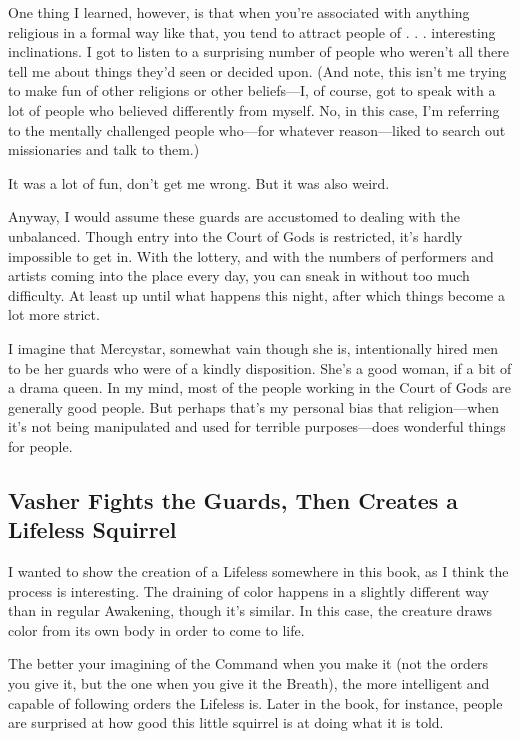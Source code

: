 One thing I learned, however, is that when you’re associated with anything religious in a formal way like that, you tend to attract people of . . . interesting inclinations. I got to listen to a surprising number of people who weren’t all there tell me about things they’d seen or decided upon. (And note, this isn’t me trying to make fun of other religions or other beliefs—I, of course, got to speak with a lot of people who believed differently from myself. No, in this case, I’m referring to the mentally challenged people who—for whatever reason—liked to search out missionaries and talk to them.)

It was a lot of fun, don’t get me wrong. But it was also weird.

Anyway, I would assume these guards are accustomed to dealing with the unbalanced. Though entry into the Court of Gods is restricted, it’s hardly impossible to get in. With the lottery, and with the numbers of performers and artists coming into the place every day, you can sneak in without too much difficulty. At least up until what happens this night, after which things become a lot more strict.

I imagine that Mercystar, somewhat vain though she is, intentionally hired men to be her guards who were of a kindly disposition. She’s a good woman, if a bit of a drama queen. In my mind, most of the people working in the Court of Gods are generally good people. But perhaps that’s my personal bias that religion—when it’s not being manipulated and used for terrible purposes—does wonderful things for people.

\subsection*{Vasher Fights the Guards, Then Creates a Lifeless Squirrel}

I wanted to show the creation of a Lifeless somewhere in this book, as I think the process is interesting. The draining of color happens in a slightly different way than in regular Awakening, though it’s similar. In this case, the creature draws color from its own body in order to come to life.

The better your imagining of the Command when you make it (not the orders you give it, but the one when you give it the Breath), the more intelligent and capable of following orders the Lifeless is. Later in the book, for instance, people are surprised at how good this little squirrel is at doing what it is told.


